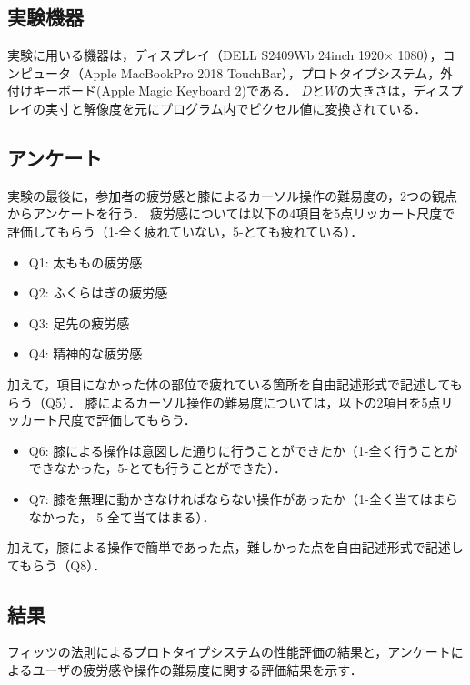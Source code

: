\documentclass[submit, techrep]{ipsj}
\begin{document}
\subsection{実験機器}
実験に用いる機器は，ディスプレイ（DELL S2409Wb 24inch 1920$\times$ 1080），コンピュータ（Apple MacBookPro 2018 TouchBar），プロトタイプシステム，外付けキーボード(Apple Magic Keyboard 2)である．
$D$と$W$の大きさは，ディスプレイの実寸と解像度を元にプログラム内でピクセル値に変換されている．
\subsection{アンケート}
実験の最後に，参加者の疲労感と膝によるカーソル操作の難易度の，2つの観点からアンケートを行う．
疲労感については以下の4項目を5点リッカート尺度で評価してもらう（1-全く疲れていない，5-とても疲れている）．
\begin{itemize}
	\item {Q1: }太ももの疲労感
	\item {Q2: }ふくらはぎの疲労感
	\item {Q3: }足先の疲労感
	\item {Q4: }精神的な疲労感
\end{itemize}
加えて，項目になかった体の部位で疲れている箇所を自由記述形式で記述してもらう（Q5）．
膝によるカーソル操作の難易度については，以下の2項目を5点リッカート尺度で評価してもらう．
\begin{itemize}
	\item {Q6: }膝による操作は意図した通りに行うことができたか（1-全く行うことができなかった，5-とても行うことができた）．
	\item {Q7: }膝を無理に動かさなければならない操作があったか（1-全く当てはまらなかった， 5-全て当てはまる）．
\end{itemize}
加えて，膝による操作で簡単であった点，難しかった点を自由記述形式で記述してもらう（Q8）．
\subsection{結果}
フィッツの法則によるプロトタイプシステムの性能評価の結果と，アンケートによるユーザの疲労感や操作の難易度に関する評価結果を示す．
\end{document}
